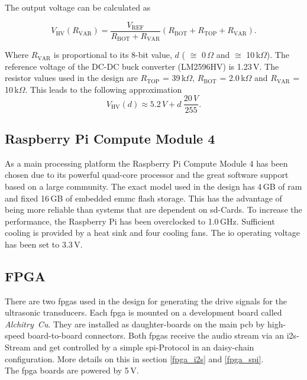 The output voltage can be calculated as

\begin{equation}
    V_{\text{HV}}(R_{\text{VAR}}) = \frac{V_{\text{REF}}}{R_{\text{BOT}} + R_{\text{VAR}}} (R_{\text{BOT}} + R_{\text{TOP}} + R_{\text{VAR}}).
\end{equation}

Where $R_{\text{VAR}}$ is proportional to its 8-bit value, $d$ ( $\cong$ 0\,$\Omega$ and  $\cong$ 10\,k$\Omega$). The reference voltage of the DC-DC buck converter (LM2596HV) is 1.23\,V. The resistor values used in the design are $R_{\text{TOP}}$ = 39\,k$\Omega$, $R_{\text{BOT}}$ = 2.0\,k$\Omega$ and $R_{\text{VAR}}$ = 10\,k$\Omega$. This leads to the following approximation
 \begin{equation}
    V_{\text{HV}}(d) \approx 5.2\,V + d\:\frac{20\,V}{255}.
\end{equation}

\subsection{Raspberry Pi Compute Module 4}
As a main processing platform the Raspberry Pi Compute Module 4 has been chosen due to its powerful quad-core processor and the great software support based on a large community. The exact model used in the design has 4\,GB of \acrshort{ram} and fixed 16\,GB of embedded \acrshort{emmc} flash storage. This has the advantage of being more reliable than systems that are dependent on \acrshort{sd}-Cards.
To increase the performance, the Raspberry Pi has been overclocked to 1.0\,GHz. Sufficient cooling is provided by a heat sink and four cooling fans.
The \acrshort{io} operating voltage has been set to 3.3\,V.

\subsection{FPGA} \label{hardware_fpga}
There are two \acrshort{fpga}s used in the design for generating the drive signals for the ultrasonic transducers. Each \acrshort{fpga} is mounted on a development board called \mbox{\textit{Alchitry Cu}}. They are installed as daughter-boards on the main \acrshort{pcb} by high-speed board-to-board connectors. Both \acrshort{fpga}s receive the audio stream via an \acrshort{i2s}-Stream and get controlled by a simple \acrshort{spi}-Protocol in an daisy-chain configuration. More details on this in section \ref{fpga_i2s} and \ref{fpga_spi}.\\
The \acrshort{fpga} boards are powered by 5\,V.


